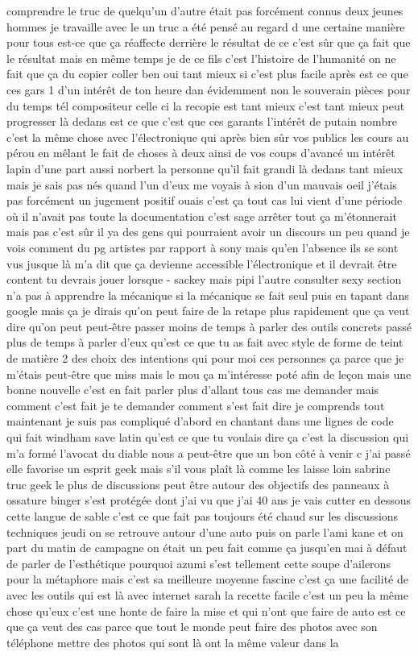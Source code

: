 comprendre le truc de quelqu'un d'autre était pas forcément connus deux jeunes hommes je travaille avec le un truc a été pensé au regard d une certaine manière pour tous est-ce que ça réaffecte derrière le résultat de ce c'est sûr que ça fait que le résultat mais en même temps je de ce fils c'est l'histoire de l'humanité on ne fait que ça du copier coller ben oui tant mieux si c'est plus facile après est ce que ces gars 1 d'un intérêt de ton heure dan évidemment non le souverain pièces pour du temps tél compositeur celle ci la recopie est tant mieux c'est tant mieux peut progresser là dedans est ce que c'est que ces garants l'intérêt de putain nombre c'est la même chose avec l'électronique qui après bien sûr vos publics les cours au pérou en mêlant le fait de choses à deux ainsi de vos coups d'avancé un intérêt lapin d'une part aussi norbert la personne qu'il fait grandi là dedans tant mieux mais je sais pas nés quand l'un d'eux me voyais à sion d'un mauvais oeil j'étais pas forcément un jugement positif ouais c'est ça tout cas lui vient d'une période où il n'avait pas toute la documentation c'est sage arrêter tout ça m'étonnerait mais pas c'est sûr il ya des gens qui pourraient avoir un discours un peu quand je vois comment du pg artistes par rapport à sony mais qu'en l'absence ils se sont vus jusque là m'a dit que ça devienne accessible l'électronique et il devrait être content tu devrais jouer lorsque - sackey mais pipi l'autre consulter sexy section n'a pas à apprendre la mécanique si la mécanique se fait seul puis en tapant dans google mais ça je dirais qu'on peut faire de la retape plus rapidement que ça veut dire qu'on peut peut-être passer moins de temps à parler des outils concrets passé plus de temps à parler d'eux qu'est ce que tu as fait avec style de forme de teint de matière 2 des choix des intentions qui pour moi ces personnes ça parce que je m'étais peut-être que miss mais le mou ça m'intéresse poté afin de leçon mais une bonne nouvelle c'est en fait parler plus d'allant tous cas me demander mais comment c'est fait je te demander comment s'est fait dire je comprends tout maintenant je suis pas compliqué d'abord en chantant dans une lignes de code qui fait windham save latin qu'est ce que tu voulais dire ça c'est la discussion qui m'a formé l'avocat du diable nous a peut-être que un bon côté à venir c j'ai passé elle favorise un esprit geek mais s'il vous plaît là comme les laisse loin sabrine truc geek le plus de discussions peut être autour des objectifs des panneaux à ossature binger s'est protégée dont j'ai vu que j'ai 40 ans je vais cutter en dessous cette langue de sable c'est ce que fait pas toujours été chaud sur les discussions techniques jeudi on se retrouve autour d'une auto puis on parle l'ami kane et on part du matin de campagne on était un peu fait comme ça jusqu'en mai à défaut de parler de l'esthétique pourquoi azumi s'est tellement cette soupe d'ailerons pour la métaphore mais c'est sa meilleure moyenne fascine c'est ça une facilité de avec les outils qui est là avec internet sarah la recette facile c'est un peu la même chose qu'eux c'est une honte de faire la mise et qui n'ont que faire de auto est ce que ça veut des cas parce que tout le monde peut faire des photos avec son téléphone mettre des photos qui sont là ont la même valeur dans la 